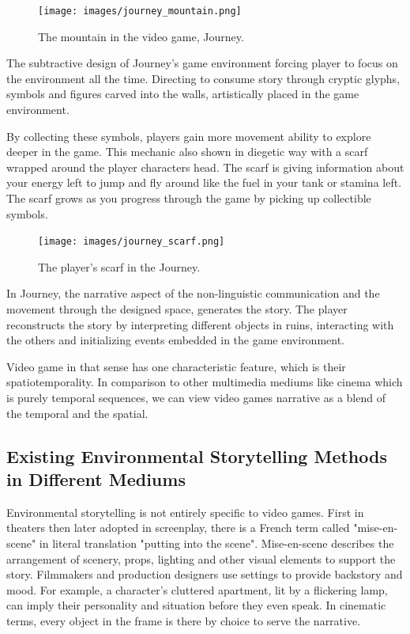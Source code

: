             \begin{figure}[H]
                \centering
                \texttt{[image: images/journey\_mountain.png]}
                \caption{The mountain in the video game, Journey.}
                \label{fig:JOURNEY_MOUNTAIN}
            \end{figure}

            The subtractive design of Journey's game environment forcing player to focus on the environment all the time. Directing to consume story through cryptic glyphs, symbols and figures carved into the walls, artistically placed in the game environment.\par

            By collecting these symbols, players gain more movement ability to explore deeper in the game. This mechanic also shown in diegetic way with a scarf wrapped around the player characters head. The scarf is giving information about your energy left to jump and fly around like the fuel in your tank or stamina left. The scarf grows as you progress through the game by picking up collectible symbols.\par

            \begin{figure}[H]
                \centering
                \texttt{[image: images/journey\_scarf.png]}
                \caption{The player's scarf in the Journey.}
                \label{fig:JOURNEY_SCARF}
            \end{figure}      

            In Journey, the narrative aspect of the non-linguistic communication and the movement through the designed space, generates the story. The player reconstructs the story by interpreting different objects in ruins, interacting with the others and initializing events embedded in the game environment.\par

            Video game in that sense has one characteristic feature, which is their spatiotemporality. In comparison to other multimedia mediums like cinema which is purely temporal sequences, we can view video games narrative as a blend of the temporal and the spatial\cite{Liminal_Space_Between_Embedded_and_Emergent_Narrative}.
        \subsection{Existing Environmental Storytelling Methods in Different Mediums}
            Environmental storytelling is not entirely specific to video games. First in theaters then later adopted in screenplay, there is a French term called "mise-en-scene" in literal translation "putting into the scene". Mise-en-scene describes the arrangement of scenery, props, lighting and other visual elements to support the story. Filmmakers and production designers use settings to provide backstory and mood. For example, a character’s cluttered apartment, lit by a flickering lamp, can imply their personality and situation before they even speak. In cinematic terms, every object in the frame is there by choice to serve the narrative.\cite{Mise_en_scene}\par
        
